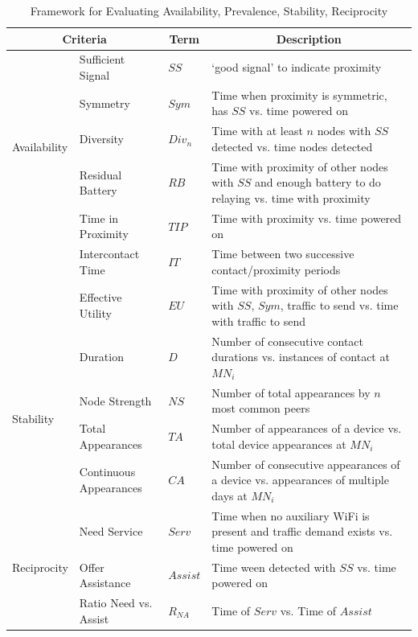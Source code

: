 \begin{table}[t] 
\caption{Framework for Evaluating Availability, Prevalence, Stability, Reciprocity} 
\centering
\begin{tabular}{l|p{3.5cm}|p{1.5cm}|p{11cm}}
\hline
\multicolumn{2}{c|}{Criteria} & \multicolumn{1}{c|}{Term} &\multicolumn{1}{c}{Description}  \\ 				
\hline
\hline  
\multirow{5}{*}{Availability}   & Sufficient Signal & $SS$ 	& `good signal' to indicate proximity  \\ 
\cline{2-4}		 			  & Symmetry & $Sym$		& Time when proximity is symmetric, has $SS$ vs. time powered on \\
\cline{2-4}		  		           & Diversity & $Div_n$	         & Time with at least $n$ nodes with $SS$ detected vs. time nodes detected \\ 
\cline{2-4}					  & Residual Battery & $RB$	& Time with proximity of other nodes with $SS$ and enough battery to do relaying vs. time with proximity \\

\hline  
\multirow{2}{*}{Prevalence}   & Time in Proximity & $TIP$ 	& Time with proximity vs. time powered on  \\ 
\cline{2-4}					  & Intercontact Time & $IT$	& Time between two successive contact/proximity periods \\
\cline{2-4}					  & Effective Utility & $EU$	& Time with proximity of other nodes with $SS$, $Sym$, traffic to send vs. time with traffic to send \\

\hline \multirow{4}{*}{Stability} 		& Duration & $D$			& Number of consecutive contact durations vs. instances of contact at $MN_i$ \\
\cline{2-4}			     			&  Node Strength & $NS$	&  Number of total appearances by $n$ most common peers \\
\cline{2-4}			     			&  Total Appearances & $TA$	& Number of appearances of a device vs. total device appearances at $MN_i$ \\
\cline{2-4}			     			&  Continuous Appearances & $CA$	& Number of consecutive appearances of a device vs. appearances of multiple days at $MN_i$ \\
\hline \multirow{4}{*}{Reciprocity}  & Need Service & $Serv$ & Time when no auxiliary WiFi is present and traffic demand exists vs. time powered on\\
\cline{2-4}	  		       		 & Offer Assistance & $Assist$ & Time ween detected with $SS$ vs. time powered on 	\\
\cline{2-4}					 & Ratio Need vs. Assist & $R_{NA}$ & Time of $Serv$ vs. Time of $Assist$ \\ 
\hline
\end{tabular}
\label{table:metrics} 
\end{table}

